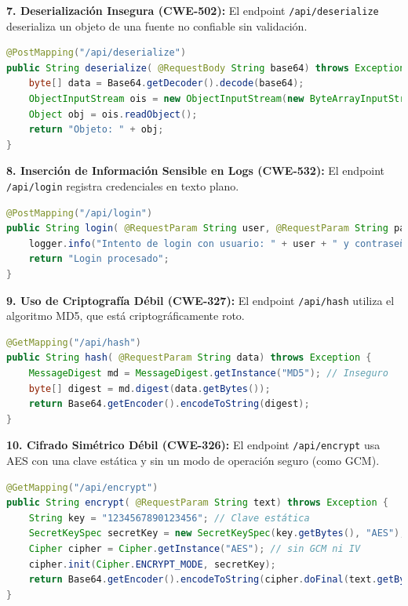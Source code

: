 \textbf{7. Deserialización Insegura (CWE-502):} El endpoint \texttt{/api/deserialize} deserializa un objeto de una fuente no confiable sin validación.
\begin{lstlisting}[language=java, caption={Código vulnerable a Deserialización Insegura.}]
@PostMapping("/api/deserialize")
public String deserialize( @RequestBody String base64) throws Exception {
    byte[] data = Base64.getDecoder().decode(base64);
    ObjectInputStream ois = new ObjectInputStream(new ByteArrayInputStream(data));
    Object obj = ois.readObject();
    return "Objeto: " + obj;
}
\end{lstlisting}

\textbf{8. Inserción de Información Sensible en Logs (CWE-532):} El endpoint \texttt{/api/login} registra credenciales en texto plano.
\begin{lstlisting}[language=java, caption={Logs con información sensible.}]
@PostMapping("/api/login")
public String login( @RequestParam String user, @RequestParam String password) {
    logger.info("Intento de login con usuario: " + user + " y contraseña: " + password); // Log inseguro
    return "Login procesado";
}
\end{lstlisting}

\textbf{9. Uso de Criptografía Débil (CWE-327):} El endpoint \texttt{/api/hash} utiliza el algoritmo MD5, que está criptográficamente roto.
\begin{lstlisting}[language=java, caption={Uso de un algoritmo de hash débil (MD5).}]
@GetMapping("/api/hash")
public String hash( @RequestParam String data) throws Exception {
    MessageDigest md = MessageDigest.getInstance("MD5"); // Inseguro
    byte[] digest = md.digest(data.getBytes());
    return Base64.getEncoder().encodeToString(digest);
}
\end{lstlisting}

\textbf{10. Cifrado Simétrico Débil (CWE-326):} El endpoint \texttt{/api/encrypt} usa AES con una clave estática y sin un modo de operación seguro (como GCM).
\begin{lstlisting}[language=java, caption={Cifrado simétrico débil (AES con clave fija).}]
@GetMapping("/api/encrypt")
public String encrypt( @RequestParam String text) throws Exception {
    String key = "1234567890123456"; // Clave estática
    SecretKeySpec secretKey = new SecretKeySpec(key.getBytes(), "AES");
    Cipher cipher = Cipher.getInstance("AES"); // sin GCM ni IV
    cipher.init(Cipher.ENCRYPT_MODE, secretKey);
    return Base64.getEncoder().encodeToString(cipher.doFinal(text.getBytes()));
}
\end{lstlisting}


